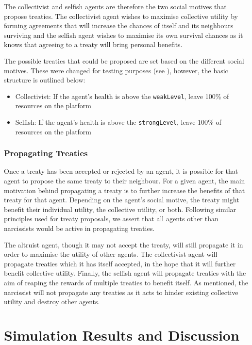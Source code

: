 The collectivist and selfish agents are therefore the two social motives that propose treaties. The collectivist agent wishes to maximise collective utility by forming agreements that will increase the chances of itself and its neighbours surviving and the selfish agent wishes to maximise its own survival chances as it knows that agreeing to a treaty will bring personal benefits.

The possible treaties that could be proposed are set based on the different social motives. These were changed for testing purposes (see ), however, the basic structure is outlined below:
\begin{itemize}
    \item Collectivist: If the agent's health is above the \texttt{weakLevel}, leave 100\% of resources on the platform
    \item Selfish: If the agent's health is above the \texttt{strongLevel}, leave 100\% of resources on the platform
\end{itemize}

\subsubsection{Propagating Treaties}

Once a treaty has been accepted or rejected by an agent, it is possible for that agent to propose the same treaty to their neighbour. For a given agent, the main motivation behind propagating a treaty is to further increase the benefits of that treaty for that agent. Depending on the agent's social motive, the treaty might benefit their individual utility, the collective utility, or both. Following similar principles used for treaty proposals, we assert that all agents other than narcissists would be active in propagating treaties.

The altruist agent, though it may not accept the treaty, will still propagate it in order to maximise the utility of other agents. The collectivist agent will propagate treaties which it has itself accepted, in the hope that it will further benefit collective utility. Finally, the selfish agent will propagate treaties with the aim of reaping the rewards of multiple treaties to benefit itself. As mentioned, the narcissist will not propagate any treaties as it acts to hinder existing collective utility and destroy other agents. 



\section{Simulation Results and Discussion}\label{simulation_results}

